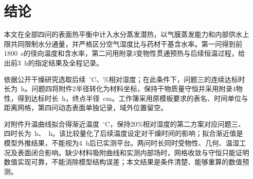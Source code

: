 \section{结论}
本文在全部四问的表面热平衡中计入水分蒸发潜热，以气膜蒸发能力和内部供水上限共同限制水分通量，并严格区分空气湿度比与药材干基含水率。第一问得到前1800~s的径向温度和含水率，第二问用附录3变物性贯通预热与后续恒温过程，给出前3~h的指定结果及全程记录。

依据公开干燥研究选取后续\EnvTempC{}~$^\circ$C、\EnvRHPercent{}\%相对湿度；在此条件下，问题三的连续达标时长为\QThreeEndH{}~h。问题四将附件2半径转化为材料坐标，保持干物质量守恒并采用附录4物性，得到达标时长\QFourEndH{}~h，终点半径\QFourEndRadiusCm{}~cm。工作簿采用原模板要求的表名、时间单位与距离网格，第四问动态表面单独记录，域外位置留空。

对附件升温曲线拟合得渐近温度\FitTempC{}~$^\circ$C，保持20\%相对湿度的第二方案对应问题三、四时长为\FitQThreeEndH{}~h、\FitQFourEndH{}~h。该比较量化了后续温度设定对干燥时间的影响；拟合渐近值是模型外推结果，不能视为4~h后已实测平台。两问时长同时受物性、几何、温湿工况及表面闭合影响。缺少材料吸附曲线和实测内部场时，网格收敛与守恒只能证明数值实现可靠，不能消除模型结构误差；本文结果是条件清楚、能够重算的数值预测。
